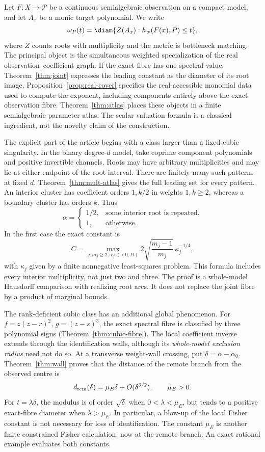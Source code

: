 Let $F:X\to\mathcal P$ be a continuous semialgebraic observation on a compact
model, and let $A_x$ be a monic target polynomial. We write
\[
 \omega_P(t)=\diam\{Z(A_x):h_w(F(x),P)\le t\},
\]
where $Z$ counts roots with multiplicity and the metric is bottleneck
matching. The principal object is the simultaneous weighted specialization
of the real observation--coefficient graph. If the exact fibre has one
spectral value, Theorem~\ref{thm:joint} expresses the leading constant as the
diameter of its root image. Proposition~\ref{prop:real-cover} specifies the
real-accessible monomial data used to compute the exponent, including
components entirely above the exact observation fibre. Theorem~\ref{thm:atlas}
places these objects in a finite semialgebraic parameter atlas. The scalar
valuation formula is a classical ingredient, not the novelty claim of the
construction.

The explicit part of the article begins with a class larger than a fixed
cubic singularity. In the binary degree-$d$ model, take coprime component
polynomials and positive invertible channels. Roots may have arbitrary
multiplicities and may lie at either endpoint of the root interval. There
are finitely many such patterns at fixed $d$. Theorem~\ref{thm:mult-atlas}
gives the full leading set for every pattern. An interior cluster has
coefficient orders $1,k/2$ in weights $1,k\ge2$, whereas a boundary cluster
has orders $k$. Thus
\[
 \alpha=\begin{cases}1/2,&\text{some interior root is repeated},\\
 1,&\text{otherwise}.
 \end{cases}
\]
In the first case the exact constant is
\[
 C=\max_{j:m_j\ge2,\ r_j\in(0,D)}
       2\sqrt{\frac{m_j-1}{m_j}}\,\kappa_j^{-1/4},
\]
with $\kappa_j$ given by a finite nonnegative least-squares problem. This
formula includes every interior multiplicity, not just two and three.
The proof is a whole-model Hausdorff comparison with realizing root arcs.
It does not replace the joint fibre by a product of marginal bounds.

The rank-deficient cubic class has an additional global phenomenon.
For $f=z(z-r)^2$, $g=(z-s)^3$, the exact spectral fibre is classified by
three polynomial signs (Theorem~\ref{thm:cubic-fibre}). The local coefficient
inverse extends through the identification walls, although its
\emph{whole-model exclusion radius} need not do so. At a transverse
weight-wall crossing, put $\delta=\alpha-\alpha_0$. Theorem~\ref{thm:wall}
proves that the distance of the remote branch from the observed centre is
\[
 d_{\rm rem}(\delta)=\mu_E\delta+O(\delta^{3/2}),\qquad \mu_E>0.
\]
For $t=\lambda\delta$, the modulus is of order $\sqrt\delta$ when
$0<\lambda<\mu_E$, but tends to a positive exact-fibre diameter when
$\lambda>\mu_E$. In particular, a blow-up of the local Fisher constant is
not necessary for loss of identification. The constant $\mu_E$ is another
finite constrained Fisher calculation, now at the remote branch. An exact
rational example evaluates both constants.

